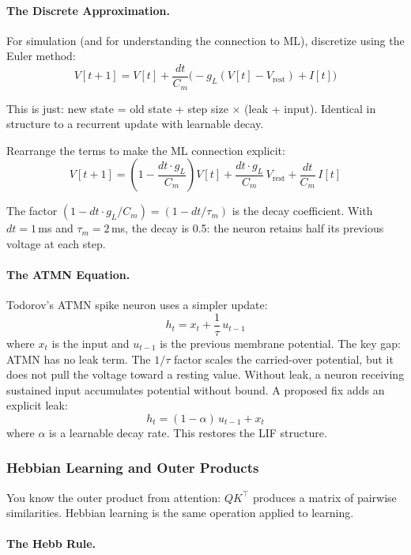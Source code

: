 \documentclass[11pt,a4paper]{article}
\begin{document}
\paragraph{The Discrete Approximation.}

For simulation (and for understanding the connection to ML), discretize using the Euler method:
\[
  V[t{+}1] = V[t] + \frac{dt}{C_m}\bigl(-g_L(V[t] - V_{\mathrm{rest}}) + I[t]\bigr)
\]

This is just: new state = old state + step size $\times$ (leak + input). Identical in structure to a recurrent update with learnable decay.

Rearrange the terms to make the ML connection explicit:
\[
  V[t{+}1] = \left(1 - \frac{dt \cdot g_L}{C_m}\right) V[t] + \frac{dt \cdot g_L}{C_m}\, V_{\mathrm{rest}} + \frac{dt}{C_m}\, I[t]
\]

The factor $(1 - dt \cdot g_L / C_m) = (1 - dt/\tau_m)$ is the decay coefficient. With $dt = 1$\,ms and $\tau_m = 2$\,ms, the decay is 0.5: the neuron retains half its previous voltage at each step.

\paragraph{The ATMN Equation.}

Todorov's ATMN spike neuron uses a simpler update:
\[
  h_t = x_t + \frac{1}{\tau}\, u_{t-1}
\]
where $x_t$ is the input and $u_{t-1}$ is the previous membrane potential. The key gap: ATMN has no leak term. The $1/\tau$ factor scales the carried-over potential, but it does not pull the voltage toward a resting value. Without leak, a neuron receiving sustained input accumulates potential without bound. A proposed fix adds an explicit leak:
\[
  h_t = (1 - \alpha)\, u_{t-1} + x_t
\]
where $\alpha$ is a learnable decay rate. This restores the LIF structure.

\subsubsection{Hebbian Learning and Outer Products}

You know the outer product from attention: $Q K^\top$ produces a matrix of pairwise similarities. Hebbian learning is the same operation applied to learning.

\paragraph{The Hebb Rule.}
\end{document}
